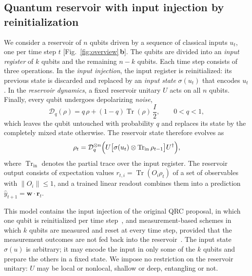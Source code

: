 \documentclass[aps,pra,reprint,superscriptaddress,floatfix]{revtex4-2}
\theoremstyle{plain}
\newcommand{\tr}{\operatorname{Tr}}
\newcommand{\Norm}[1]{\lVert #1\rVert}
\newcommand{\cD}{\mathcal D}
\newcommand{\pnl}[1]{\textsf{\textbf{#1}}}
\begin{document}
\subsection{Quantum reservoir with input injection by reinitialization}

We consider a reservoir of $n$ qubits driven by a sequence of classical inputs $u_t$, one per time step $t$ [Fig.~\ref{fig:overview}\,\pnl{b}]. The qubits are divided into an \emph{input register} of $k$ qubits and the remaining $n-k$ qubits. Each time step consists of three operations. In the \emph{input injection}, the input register is reinitialized: its previous state is discarded and replaced by an \emph{input state} $\sigma(u_t)$ that encodes $u_t$. In the \emph{reservoir dynamics}, a fixed reservoir unitary $U$ acts on all $n$ qubits. Finally, every qubit undergoes depolarizing \emph{noise},
\begin{equation}
\cD_q(\rho)=q\,\rho+(1-q)\tr(\rho)\,\frac I2,\qquad0<q<1,
\label{eq:depol}
\end{equation}
which leaves the qubit untouched with probability $q$ and replaces its state by the completely mixed state otherwise. The reservoir state therefore evolves as
\begin{equation}
\rho_t=\cD_q^{\otimes n}\Bigl(U\bigl[\sigma(u_t)\otimes\tr_{\mathrm{in}}\rho_{t-1}\bigr]U^\dagger\Bigr),
\label{eq:model}
\end{equation}
where $\tr_{\mathrm{in}}$ denotes the partial trace over the input register. The reservoir output consists of expectation values $r_{t,i}=\tr(O_i\rho_t)$ of a set of observables with $\Norm{O_i}\le1$, and a trained linear readout combines them into a prediction $\hat y_{t+1}=\bm w\cdot\bm r_t$.

This model contains the input injection of the original QRC proposal, in which one qubit is reinitialized per time step~\cite{Fujii2017}, and measurement-based schemes in which $k$ qubits are measured and reset at every time step, provided that the measurement outcomes are not fed back into the reservoir~\cite{Yasuda2023,Hu2024}. The input state $\sigma(u)$ is arbitrary; it may encode the input in only some of the $k$ qubits and prepare the others in a fixed state. We impose no restriction on the reservoir unitary: $U$ may be local or nonlocal, shallow or deep, entangling or not.
\end{document}
